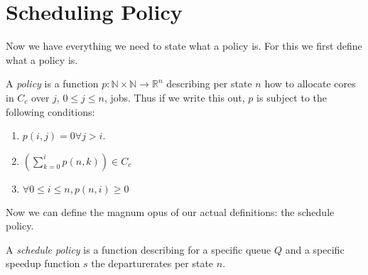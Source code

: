 \section{Scheduling Policy}
Now we have everything we need to state what a policy is. For this we first define what a policy is.
\begin{definition}\label{def:Policy}\leanok
  A \textit{policy} is a function $p \colon \mathbb{N} \times \mathbb{N} \to \mathbb{R}^n$ describing
  per state $n$ how to allocate cores in $C_c$ over $j$, $0 \leq j \leq n$, jobs. Thus if we write this out,
  $p$ is subject to the following conditions:
  \begin{enumerate}
    \item $p(i,j) = 0 \forall j > i$.
    \item $\left(\sum_{k=0}^i p(n, k)\right) \in C_c$
    \item $\forall 0 \leq i \leq n, p(n,i) \geq 0$
  \end{enumerate}
\end{definition}

Now we can define the magnum opus of our actual definitions: the schedule policy.
\begin{definition}\label{def:SchedulePolicy}\notready
  A \textit{schedule policy} is a function describing for a specific queue $Q$ and a specific speedup function
  $s$ the departurerates per state $n$.
\end{definition}
